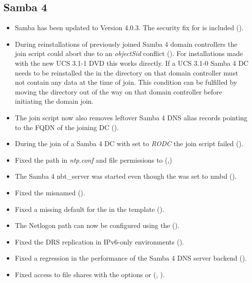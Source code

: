 \subsection{Samba 4}
\begin{itemize}
\item Samba has been updated to Version 4.0.3. The security fix for
   is included ().
\item During reinstallations of previously joined Samba 4 domain controllers
	the  join script could abort due
	to an \emph{objectSid} conflict (). For
    installations made with the
	new UCS 3.1-1 DVD this works directly. If a UCS 3.1-0 Samba 4 DC needs to be
	reinstalled the  in the directory
     on that domain controller
	must not contain any data at the time of join. This condition can be fulfilled
	by moving the directory out of the way on that domain controller
    before initiating the domain join.
\item The join script now also removes leftover Samba 4 DNS
    alias records pointing to the FQDN of the joining DC ().
\item During the join of a Samba 4 DC with  set
  to \emph{RODC} the  join script
  failed ().
\item Fixed the  path in \emph{ntp.conf} and
  file permissions to 
  (,)
\item The Samba 4 nbt\_server was started even though the
   was set to nmbd ().
\item Fixed the misnamed  ().
\item Fixed a missing default for the  in the
   template ().
\item The Netlogon path can now be configured using the
   ().
\item Fixed the DRS replication in IPv6-only environments
  ().
\item Fixed a regression in the performance of the Samba 4 DNS server
  backend ().
\item Fixed access to file shares with the options  or  (, ).

\end{itemize}
